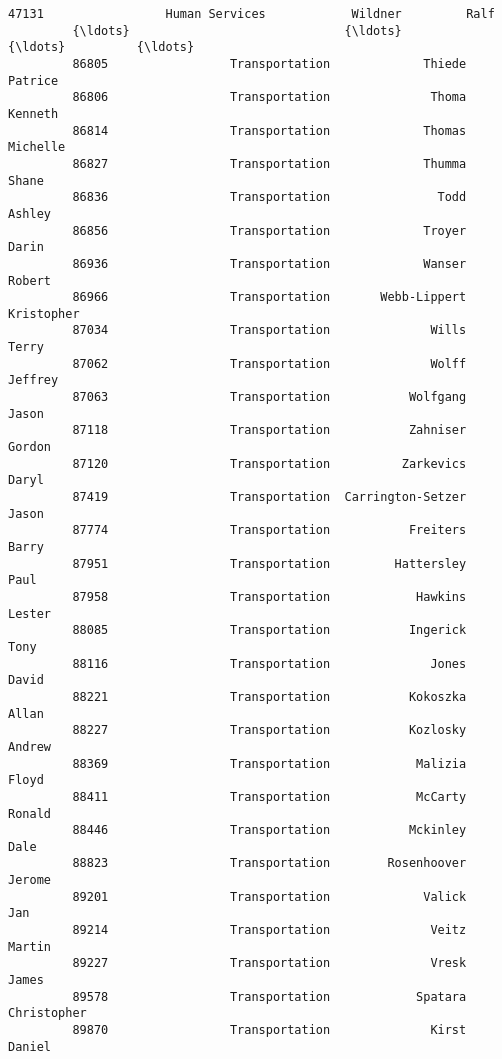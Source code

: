 \documentclass[11pt]{article}
\begin{document}
\begin{Verbatim}[commandchars=\\\{\}]
         47131                 Human Services            Wildner         Ralf   
         {\ldots}                              {\ldots}                {\ldots}          {\ldots}   
         86805                 Transportation             Thiede      Patrice   
         86806                 Transportation              Thoma      Kenneth   
         86814                 Transportation             Thomas     Michelle   
         86827                 Transportation             Thumma        Shane   
         86836                 Transportation               Todd       Ashley   
         86856                 Transportation             Troyer        Darin   
         86936                 Transportation             Wanser       Robert   
         86966                 Transportation       Webb-Lippert   Kristopher   
         87034                 Transportation              Wills        Terry   
         87062                 Transportation              Wolff      Jeffrey   
         87063                 Transportation           Wolfgang        Jason   
         87118                 Transportation           Zahniser       Gordon   
         87120                 Transportation          Zarkevics        Daryl   
         87419                 Transportation  Carrington-Setzer        Jason   
         87774                 Transportation           Freiters        Barry   
         87951                 Transportation         Hattersley         Paul   
         87958                 Transportation            Hawkins       Lester   
         88085                 Transportation           Ingerick         Tony   
         88116                 Transportation              Jones        David   
         88221                 Transportation           Kokoszka        Allan   
         88227                 Transportation           Kozlosky       Andrew   
         88369                 Transportation            Malizia        Floyd   
         88411                 Transportation            McCarty       Ronald   
         88446                 Transportation           Mckinley         Dale   
         88823                 Transportation        Rosenhoover       Jerome   
         89201                 Transportation             Valick          Jan   
         89214                 Transportation              Veitz       Martin   
         89227                 Transportation              Vresk        James   
         89578                 Transportation            Spatara  Christopher   
         89870                 Transportation              Kirst       Daniel   
         

\end{Verbatim}
\end{document}
